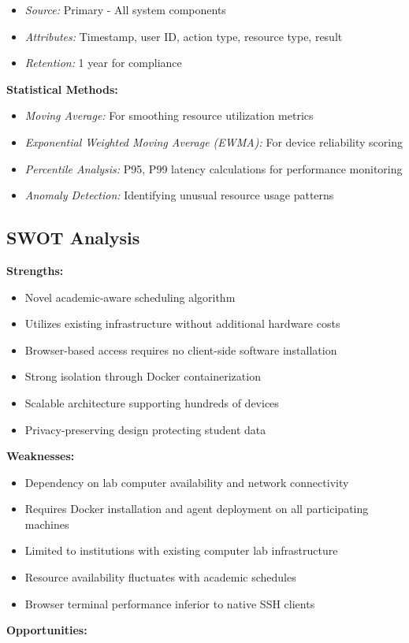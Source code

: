 \documentclass[12pt,a4paper]{article}
\begin{document}
\begin{itemize}
    \item \textit{Source:} Primary - All system components
    \item \textit{Attributes:} Timestamp, user ID, action type, resource type, result
    \item \textit{Retention:} 1 year for compliance
\end{itemize}

\textbf{Statistical Methods:}

\begin{itemize}
    \item \textit{Moving Average:} For smoothing resource utilization metrics
    \item \textit{Exponential Weighted Moving Average (EWMA):} For device reliability scoring
    \item \textit{Percentile Analysis:} P95, P99 latency calculations for performance monitoring
    \item \textit{Anomaly Detection:} Identifying unusual resource usage patterns
\end{itemize}

\subsection{SWOT Analysis}
\label{sec:swot}

\textbf{Strengths:}

\begin{itemize}
    \item Novel academic-aware scheduling algorithm
    \item Utilizes existing infrastructure without additional hardware costs
    \item Browser-based access requires no client-side software installation
    \item Strong isolation through Docker containerization
    \item Scalable architecture supporting hundreds of devices
    \item Privacy-preserving design protecting student data
\end{itemize}

\textbf{Weaknesses:}

\begin{itemize}
    \item Dependency on lab computer availability and network connectivity
    \item Requires Docker installation and agent deployment on all participating machines
    \item Limited to institutions with existing computer lab infrastructure
    \item Resource availability fluctuates with academic schedules
    \item Browser terminal performance inferior to native SSH clients
\end{itemize}
\textbf{Opportunities:}
\end{document}
